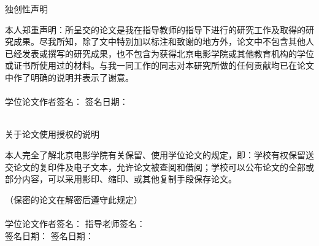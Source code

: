 \newpage

\begin{spacing}{2}
    \begin{center}
        \hei{}\selectfont 独创性声明
    \end{center}
    
    \kai{}\selectfont
        \par 本人郑重声明：所呈交的论文是我在指导教师的指导下进行的研究工作及取得的研究成果。尽我所知，除了文中特别加以标注和致谢的地方外，论文中不包含其他人已经发表或撰写的研究成果，也不包含为获得北京电影学院或其他教育机构的学位或证书所使用过的材料。与我一同工作的同志对本研究所做的任何贡献均已在论文中作了明确的说明并表示了谢意。\\
        ~\\
        学位论文作者签名：{\underline{\qquad\qquad\qquad}}
        \qquad
        签名日期：{\underline{\qquad\qquad\qquad\qquad}}\\
        ~\\
    
    \begin{center}
        \hei{}\selectfont 关于论文使用授权的说明
    \end{center}

    \kai{}\selectfont
        \par 本人完全了解北京电影学院有关保留、使用学位论文的规定，即：学校有权保留送交论文的复印件及电子文本，允许论文被查阅和借阅；学校可以公布论文的全部或部分内容，可以采用影印、缩印、或其他复制手段保存论文。
        \par （保密的论文在解密后遵守此规定）\\
        ~\\
        学位论文作者签名：{\underline{\qquad\qquad\qquad}}
        \qquad
        指导老师签名：{\underline{\qquad\qquad\qquad}}\\
        签名日期：{\underline{\qquad\qquad\qquad\qquad}}
        \qquad\qquad
        签名日期：{\underline{\qquad\qquad\qquad\qquad}}
\end{spacing}
\thispagestyle{empty}